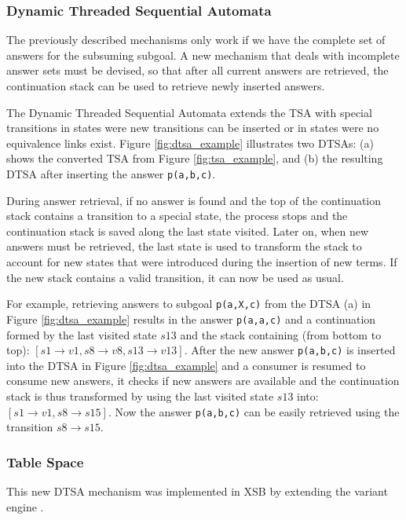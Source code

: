 \subsubsection{Dynamic Threaded Sequential Automata}

The previously described mechanisms only work if we have the complete set of answers for the subsuming subgoal.
A new mechanism that deals with incomplete answer sets must be devised, so that after all current answers
are retrieved, the continuation stack can be used to retrieve newly inserted answers.

The Dynamic Threaded Sequential Automata extends the TSA with special transitions in states
were new transitions can be inserted or in states were no equivalence links exist.
Figure \ref{fig:dtsa_example} illustrates two DTSAs: (a) shows the converted TSA from Figure \ref{fig:tsa_example}, and
(b) the resulting DTSA after inserting the answer \texttt{p(a,b,c)}.

During answer retrieval, if no answer is found and the top of the continuation stack contains
a transition to a special state, the process stops and the continuation stack is saved along the last state
visited.
Later on, when new answers must be retrieved, the last state is used to transform the stack to account for new states that
were introduced during the insertion of new terms. If the new stack contains a valid transition, it
can now be used as usual.

For example, retrieving answers to subgoal \texttt{p(a,X,c)} from the DTSA (a) in Figure
\ref{fig:dtsa_example} results in the answer \texttt{p(a,a,c)} and a continuation formed by the last
visited state $s13$ and the stack containing (from bottom to top): $[s1 \rightarrow v1, s8 \rightarrow v8, s13 \rightarrow v13]$.
After the new answer \texttt{p(a,b,c)} is inserted into the DTSA in Figure \ref{fig:dtsa_example} and
a consumer is resumed to consume new answers, it checks if new answers are available and the continuation stack
is thus transformed by using the last visited state $s13$ into: $[s1 \rightarrow v1, s8 \rightarrow s15]$. Now
the answer \texttt{p(a,b,c)} can be easily retrieved using the transition $s8 \rightarrow s15$.

\subsubsection{Table Space}

This new DTSA mechanism was implemented in XSB by extending the variant engine \cite{Rao-96}.

